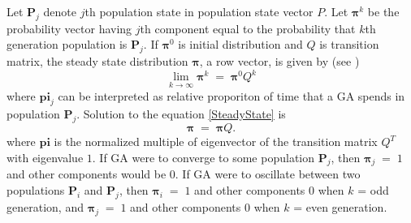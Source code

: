 Let $\bm{P}_j$ denote $j$th population state in population state vector $P$. Let $\bm{\pi}^k$ be the probability vector having $j$th component 
equal to the probability that $k$th generation population is $\bm{P}_j$. If $\bm{\pi}^0$ is initial distribution and $Q$ is transition matrix, the steady state distribution $\bm{\pi}$, a row vector, is given by (see \cite{MarkovChain})
\begin{equation}
\label{SteadyState}
\lim_{k \to \infty} \bm{\pi}^k \;=\; \bm{\pi}^0 Q^k 
\end{equation}
where $\bm{pi}_j$ can be interpreted as relative proporiton of time that a GA spends in population $\bm{P}_j$.
Solution to the equation \ref{SteadyState} is
\begin{equation}
\label{SteadyStateSolution}
\bm{\pi} \; = \; \bm{\pi} Q.
\end{equation}
where $\bm{pi}$ is the normalized multiple of eigenvector of the transition matrix $Q^T$ with eigenvalue $1$.
If GA were to converge to some population $\bm{P}_j$, 
then $\bm{\pi}_j \;=\; 1$ and other components would be $0$. If GA were to oscillate between two populations $\bm{P}_i$ and $\bm{P}_j$, then 
$\bm{\pi}_i \;=\; 1$ and other components $0$ when $k$ = odd generation, and $\bm{\pi}_j \;=\; 1$ and other components $0$ when $k$ = even generation.


